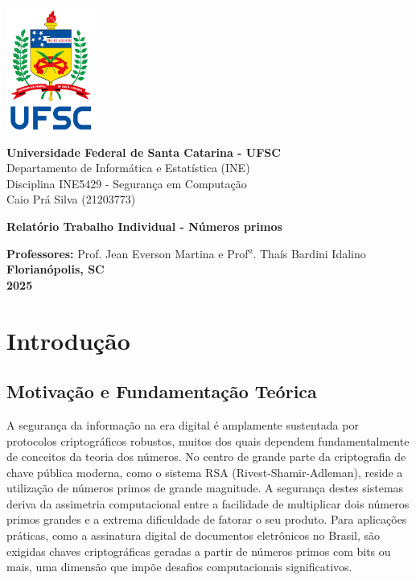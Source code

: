 \documentclass[a4paper, 11pt]{article}
\begin{document}
\begin{titlepage}

    \noindent\includegraphics[width=0.22\textwidth]{ufsc.png}\par
    \vspace{0.5cm}
    
    \centering
    \textbf{Universidade Federal de Santa Catarina - UFSC}\\
    Departamento de Informática e Estatística (INE)\\
    Disciplina INE5429 - Segurança em Computação\\[0.5cm]
    Caio Prá Silva (21203773)\\
    
    \vfill
    
    \centering
    {\bfseries\Large
    Relatório Trabalho Individual - Números primos\par}
    
    \vfill 
    
    \centering
    \textbf{Professores:} Prof. Jean Everson Martina e Prof$^{a}$. Thaís Bardini Idalino\\[0.3cm]
    
    \centering
    \textbf{Florianópolis, SC}\\
    \textbf{2025}
    
\end{titlepage}

\section{Introdução}

\subsection{Motivação e Fundamentação Teórica}

A segurança da informação na era digital é amplamente sustentada por protocolos criptográficos robustos, muitos dos quais dependem fundamentalmente de conceitos da teoria dos números. No centro de grande parte da criptografia de chave pública moderna, como o sistema RSA (Rivest-Shamir-Adleman), reside a utilização de números primos de grande magnitude. \parencite{rsa-aes} A segurança destes sistemas deriva da assimetria computacional entre a facilidade de multiplicar dois números primos grandes e a extrema dificuldade de fatorar o seu produto.  Para aplicações práticas, como a assinatura digital de documentos eletrônicos no Brasil, são exigidas chaves criptográficas geradas a partir de números primos com bits ou mais, uma dimensão que impõe desafios computacionais significativos. \parencite{iti_doc_icp_01_01}
\end{document}
